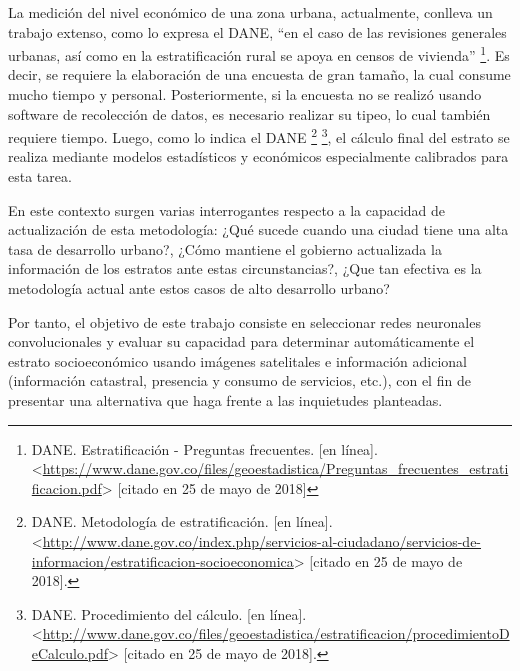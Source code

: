 La medición del nivel económico de una zona urbana, actualmente, conlleva un trabajo extenso, como lo expresa el DANE, “en el caso de las revisiones generales urbanas, así como en la estratificación rural se apoya en censos de vivienda” \footnote{DANE. Estratificación - Preguntas frecuentes. [en línea]. <\url{https://www.dane.gov.co/files/geoestadistica/Preguntas_frecuentes_estratificacion.pdf}> [citado en 25 de mayo de 2018]}. Es decir, se requiere la elaboración de una encuesta de gran tamaño, la cual consume mucho tiempo y personal. Posteriormente, si la encuesta no se realizó usando software de recolección de datos, es necesario realizar su tipeo, lo cual también requiere tiempo. Luego, como lo indica el DANE \footnote{DANE. Metodología de estratificación. [en línea]. <\url{http://www.dane.gov.co/index.php/servicios-al-ciudadano/servicios-de-informacion/estratificacion-socioeconomica}> [citado en 25 de mayo de 2018].} \footnote{DANE. Procedimiento del cálculo. [en línea]. <\url{http://www.dane.gov.co/files/geoestadistica/estratificacion/procedimientoDeCalculo.pdf}> [citado en 25 de mayo de 2018].}, el cálculo final del estrato se realiza mediante modelos estadísticos y económicos especialmente calibrados para esta tarea.
    
En este contexto surgen varias interrogantes respecto a la capacidad de actualización de esta metodología: ¿Qué sucede cuando una ciudad tiene una alta tasa de desarrollo urbano?, ¿Cómo mantiene el gobierno actualizada la información de los estratos ante estas circunstancias?, ¿Que tan efectiva es la metodología actual ante estos casos de alto desarrollo urbano?
   
Por tanto, el objetivo de este trabajo consiste en seleccionar redes neuronales convolucionales y evaluar su capacidad para determinar automáticamente el estrato socioeconómico usando imágenes satelitales e información adicional (información catastral, presencia y consumo de servicios, etc.), con el fin de presentar una alternativa que haga frente a las inquietudes planteadas.
    
